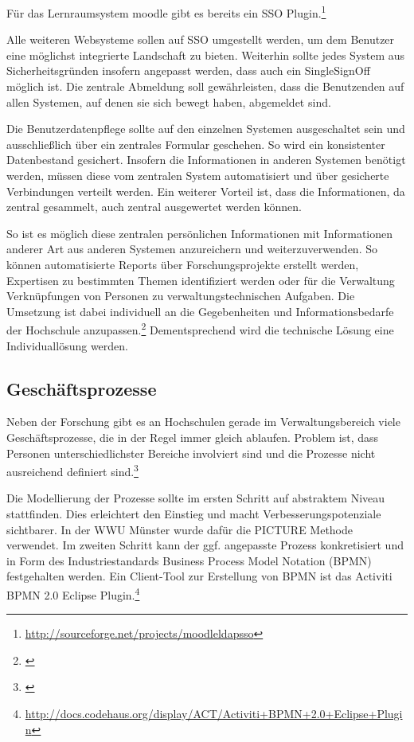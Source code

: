 Für das Lernraumsystem moodle gibt es bereits ein SSO Plugin.\footnote{\url{http://sourceforge.net/projects/moodleldapsso}}

Alle weiteren Websysteme sollen auf SSO umgestellt werden, um dem Benutzer eine möglichst integrierte Landschaft zu bieten. Weiterhin sollte jedes System aus Sicherheitsgründen insofern angepasst werden, dass auch ein SingleSignOff möglich ist. Die zentrale Abmeldung soll gewährleisten, dass die Benutzenden auf allen Systemen, auf denen sie sich bewegt haben, abgemeldet sind.

Die Benutzerdatenpflege sollte auf den einzelnen Systemen ausgeschaltet sein und ausschließlich über ein zentrales Formular geschehen. So wird ein konsistenter Datenbestand gesichert. Insofern die Informationen in anderen Systemen benötigt werden, müssen diese vom zentralen System automatisiert und über gesicherte Verbindungen verteilt werden. Ein weiterer Vorteil ist, dass die Informationen, da zentral gesammelt, auch zentral ausgewertet werden können.

So ist es möglich diese zentralen persönlichen Informationen mit Informationen anderer Art aus anderen Systemen anzureichern und weiterzuverwenden. So können automatisierte Reports über Forschungsprojekte erstellt werden, Expertisen zu bestimmten Themen identifiziert werden oder für die Verwaltung Verknüpfungen von Personen zu verwaltungstechnischen Aufgaben. Die Umsetzung ist dabei individuell an die Gegebenheiten und Informationsbedarfe der Hochschule anzupassen.\footnote{\cite{vogl_fortschritte_2012}} Dementsprechend wird die technische Lösung eine Individuallösung werden.

\subsection{Geschäftsprozesse}
Neben der Forschung gibt es an Hochschulen gerade im Verwaltungsbereich viele Geschäftsprozesse, die in der Regel immer gleich ablaufen. Problem ist, dass Personen unterschiedlichster Bereiche involviert sind und die Prozesse nicht ausreichend definiert sind.\footnote{\cite{becker_prozesse_2010}}

Die Modellierung der Prozesse sollte im ersten Schritt auf abstraktem Niveau stattfinden. Dies erleichtert den Einstieg und macht Verbesserungspotenziale sichtbarer. In der WWU Münster wurde dafür die PICTURE Methode verwendet.
Im zweiten Schritt kann der ggf. angepasste Prozess konkretisiert und in Form des Industriestandards Business Process Model Notation (BPMN) festgehalten werden. Ein Client-Tool zur Erstellung von BPMN ist das Activiti BPMN 2.0 Eclipse Plugin.\footnote{\url{http://docs.codehaus.org/display/ACT/Activiti+BPMN+2.0+Eclipse+Plugin}}

